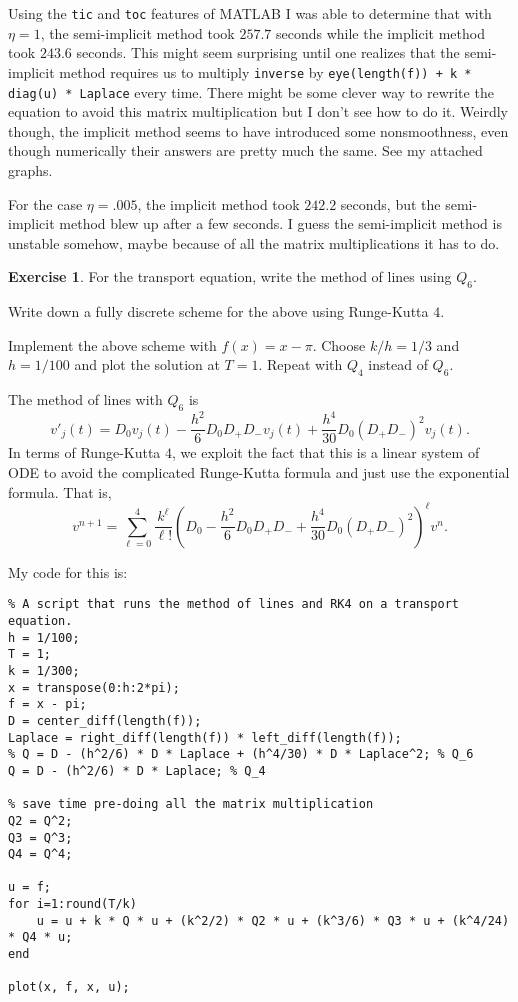 \documentclass[10pt]{article}
\theoremstyle{definition}
\newtheorem{exer}{Exercise}
\begin{document}
Using the \texttt{tic} and \texttt{toc} features of MATLAB I was able to determine that with $\eta = 1$, the semi-implicit method took $257.7$ seconds while the implicit method took $243.6$ seconds.
This might seem surprising until one realizes that the semi-implicit method requires us to multiply \texttt{inverse} by \texttt{eye(length(f)) + k * diag(u) * Laplace} every time.
There might be some clever way to rewrite the equation to avoid this matrix multiplication but I don't see how to do it.
Weirdly though, the implicit method seems to have introduced some nonsmoothness, even though numerically their answers are pretty much the same. See my attached graphs.

For the case $\eta = .005$, the implicit method took $242.2$ seconds, but the semi-implicit method blew up after a few seconds.
I guess the semi-implicit method is unstable somehow, maybe because of all the matrix multiplications it has to do.

\begin{exer}
For the transport equation, write the method of lines using $Q_6$.

Write down a fully discrete scheme for the above using Runge-Kutta $4$.

Implement the above scheme with $f(x) = x - \pi$.
Choose $k/h = 1/3$ and $h = 1/100$ and plot the solution at $T = 1$.
Repeat with $Q_4$ instead of $Q_6$.
\end{exer}

The method of lines with $Q_6$ is
$$v'_j(t) = D_0 v_j(t) - \frac{h^2}{6} D_0 D_+ D_- v_j(t) + \frac{h^4}{30} D_0 (D_+ D_-)^2 v_j(t).$$
In terms of Runge-Kutta $4$, we exploit the fact that this is a linear system of ODE to avoid the complicated Runge-Kutta formula and just use the exponential formula.
That is,
$$v^{n+1} = \sum_{\ell=0}^4 \frac{k^\ell}{\ell!} \left(D_0 - \frac{h^2}{6} D_0 D_+ D_- + \frac{h^4}{30} D_0 (D_+ D_-)^2\right)^\ell v^n.$$

My code for this is:
\begin{verbatim}
% A script that runs the method of lines and RK4 on a transport equation.
h = 1/100;
T = 1;
k = 1/300;
x = transpose(0:h:2*pi);
f = x - pi;
D = center_diff(length(f));
Laplace = right_diff(length(f)) * left_diff(length(f));
% Q = D - (h^2/6) * D * Laplace + (h^4/30) * D * Laplace^2; % Q_6
Q = D - (h^2/6) * D * Laplace; % Q_4

% save time pre-doing all the matrix multiplication
Q2 = Q^2;
Q3 = Q^3;
Q4 = Q^4;

u = f;
for i=1:round(T/k)
    u = u + k * Q * u + (k^2/2) * Q2 * u + (k^3/6) * Q3 * u + (k^4/24) * Q4 * u;
end

plot(x, f, x, u);
\end{verbatim}
\end{document}
